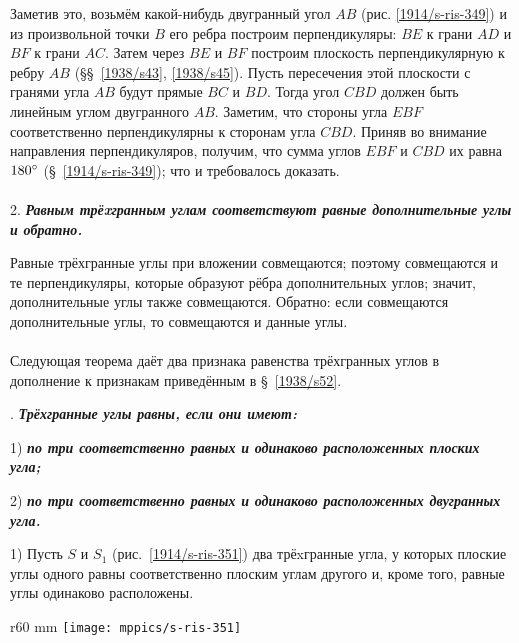 Заметив это, возьмём какой-нибудь двугранный угол $AB$ (рис. \ref{1914/s-ris-349}) и из произвольной точки $B$ его ребра построим перпендикуляры: $BE$ к грани $AD$ и $BF$ к грани $AC$.
Затем через $BE$ и $BF$ построим плоскость перпендикулярную к ребру $AB$ (§§~\ref{1938/s43}, \ref{1938/s45}).
Пусть пересечения этой плоскости с гранями угла $AB$ будут прямые $BC$ и $BD$.
Тогда угол $CBD$ должен быть линейным углом двугранного $AB$.
Заметим, что стороны угла $EBF$ соответственно перпендикулярны к сторонам угла $CBD$.
Приняв во внимание направления перпендикуляров, получим, что сумма углов $EBF$ и $CBD$ их равна $180\degree$ (§~\ref{1914/s-ris-349}); что и требовалось доказать.

\paragraph{}\label{1914/401} 
 2. \textbf{\emph{Равным трёxгранным углам соответствуют равные дополнительные углы и обратно.}}

Равные трёхгранные углы при вложении совмещаются; поэтому совмещаются и те перпендикуляры, которые образуют рёбра дополнительных углов; значит, дополнительные углы также совмещаются.
Обратно: если совмещаются дополнительные углы, то совмещаются и данные углы.

\paragraph{}\label{1914/402}
Следующая теорема даёт два признака равенства трёхгранных углов в дополнение к признакам приведённым в §~\ref{1938/s52}.

\medskip

.
\textbf{\emph{Трёхгранные углы равны, если они имеют:}}

1) \textbf{\emph{по три соответственно равных и одинаково расположенных плоских угла;}}

2) \textbf{\emph{по три соответственно равных и одинаково расположенных двугранных угла.}} 

1) Пусть $S$ и $S_1$ (рис.~\ref{1914/s-ris-351}) два трёxгранные угла, у которых плоские углы одного равны соответственно плоским углам другого и, кроме того, равные углы одинаково расположены.

\begin{wrapfigure}{r}{60 mm}
\vskip-0mm
\centering
\texttt{[image: mppics/s-ris-351]}
\caption{}\label{1914/s-ris-351}
\end{wrapfigure}

